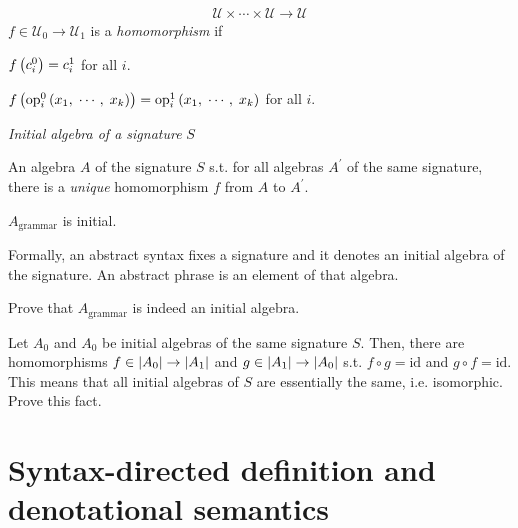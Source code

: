 \begin{enumcirc}
\begin{align*}
{			\mathcal{U} \times \cdots \times \mathcal{U} \rightarrow \mathcal{U}
		}
	\end{align*}
	\leavevmode
	$f \in \mathcal{U}_0 \rightarrow \mathcal{U}_1$ is a \emph{homomorphism} if
	\begin{enumrm}
		\item $f \left( c_i^0 \right) = c_i^1$ for all $i$.
		\item $f \left( \textrm{op}_i^0 \left( x_1,\; \cdots ,\; x_k \right) \right) =
			\textrm{op}_i^1 \left( x_1,\; \cdots ,\; x_k \right)$ for all $i$.
	\end{enumrm}

	\item
	\emph{Initial algebra of a signature} $S$
	\begin{enumrm}
		\item An algebra $A$ of the signature $S$ s.t. for all algebras $A^\prime$ of the
		same signature, there is a \emph{unique} homomorphism $f$ from $A$ to
		$A^\prime$.
		\item
		$A_{\textrm{grammar}}$ is initial.
		\item
		Formally, an abstract syntax fixes a signature and it denotes an initial
		algebra of the signature.
		An abstract phrase is an element of that algebra.
	\end{enumrm}

	\begin{exercise}
		Prove that $A_{\textrm{grammar}}$ is indeed an initial algebra.
	\end{exercise}

	\begin{exercisetab}
		Let $A_0$ and $A_0$ be initial algebras of the same signature $S$.
		Then, there are homomorphisms
		$f \in \left\vert A_0 \right\vert \rightarrow \left\vert A_1 \right\vert$ and
		$g \in \left\vert A_1 \right\vert \rightarrow \left\vert A_0 \right\vert$ s.t. $f \circ g = \textrm{id}$ and
		$g \circ f = \textrm{id}$.
		This means that all initial algebras of $S$ are essentially the same, i.e.
		isomorphic. Prove this fact.
	\end{exercisetab}

\end{enumcirc}

\section{Syntax-directed definition and denotational semantics}

